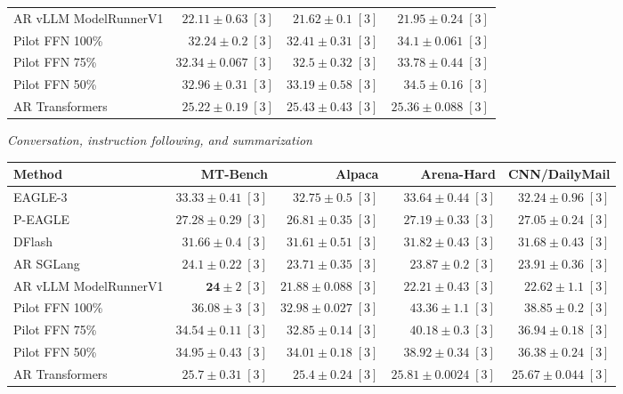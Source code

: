 \begin{table}[!htp]
\begin{tabular}{@{}>{\raggedright\arraybackslash}p{3.7cm}rrr@{}}
AR \textperiodcentered{} vLLM ModelRunnerV1 & \(\mathbf{22.11} \pm 0.63\;[3]\) & \(\mathbf{21.62} \pm 0.1\;[3]\) & \(\mathbf{21.95} \pm 0.24\;[3]\) \\
Pilot FFN 100\% & \(32.24 \pm 0.2\;[3]\) & \(32.41 \pm 0.31\;[3]\) & \(34.1 \pm 0.061\;[3]\) \\
Pilot FFN 75\% & \(32.34 \pm 0.067\;[3]\) & \(32.5 \pm 0.32\;[3]\) & \(33.78 \pm 0.44\;[3]\) \\
Pilot FFN 50\% & \(32.96 \pm 0.31\;[3]\) & \(33.19 \pm 0.58\;[3]\) & \(34.5 \pm 0.16\;[3]\) \\
AR \textperiodcentered{} Transformers & \(25.22 \pm 0.19\;[3]\) & \(25.43 \pm 0.43\;[3]\) & \(25.36 \pm 0.088\;[3]\) \\
\bottomrule
\end{tabular}\par\medskip
\textit{Conversation, instruction following, and summarization}\par\smallskip
\begin{tabular}{@{}>{\raggedright\arraybackslash}p{3.7cm}rrrr@{}}
\toprule
Method & MT-Bench & Alpaca & Arena-Hard & CNN/DailyMail \\
\midrule
EAGLE-3 & \(33.33 \pm 0.41\;[3]\) & \(32.75 \pm 0.5\;[3]\) & \(33.64 \pm 0.44\;[3]\) & \(32.24 \pm 0.96\;[3]\) \\
P-EAGLE & \(27.28 \pm 0.29\;[3]\) & \(26.81 \pm 0.35\;[3]\) & \(27.19 \pm 0.33\;[3]\) & \(27.05 \pm 0.24\;[3]\) \\
DFlash & \(31.66 \pm 0.4\;[3]\) & \(31.61 \pm 0.51\;[3]\) & \(31.82 \pm 0.43\;[3]\) & \(31.68 \pm 0.43\;[3]\) \\
AR \textperiodcentered{} SGLang & \(24.1 \pm 0.22\;[3]\) & \(23.71 \pm 0.35\;[3]\) & \(23.87 \pm 0.2\;[3]\) & \(23.91 \pm 0.36\;[3]\) \\
AR \textperiodcentered{} vLLM ModelRunnerV1 & \(\mathbf{24} \pm 2\;[3]\) & \(\mathbf{21.88} \pm 0.088\;[3]\) & \(\mathbf{22.21} \pm 0.43\;[3]\) & \(\mathbf{22.62} \pm 1.1\;[3]\) \\
Pilot FFN 100\% & \(36.08 \pm 3\;[3]\) & \(32.98 \pm 0.027\;[3]\) & \(43.36 \pm 1.1\;[3]\) & \(38.85 \pm 0.2\;[3]\) \\
Pilot FFN 75\% & \(34.54 \pm 0.11\;[3]\) & \(32.85 \pm 0.14\;[3]\) & \(40.18 \pm 0.3\;[3]\) & \(36.94 \pm 0.18\;[3]\) \\
Pilot FFN 50\% & \(34.95 \pm 0.43\;[3]\) & \(34.01 \pm 0.18\;[3]\) & \(38.92 \pm 0.34\;[3]\) & \(36.38 \pm 0.24\;[3]\) \\
AR \textperiodcentered{} Transformers & \(25.7 \pm 0.31\;[3]\) & \(25.4 \pm 0.24\;[3]\) & \(25.81 \pm 0.0024\;[3]\) & \(25.67 \pm 0.044\;[3]\) \\

\end{tabular}
\end{table}
